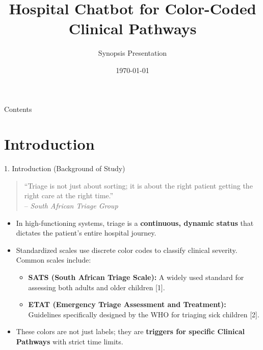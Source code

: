 \documentclass[11pt, aspectratio=169]{beamer}
\title[Hospital Chatbot for Clinical Pathways]{Hospital Chatbot for Color-Coded Clinical Pathways}
\subtitle{}
\author{Synopsis Presentation}
\date{\today}
\begin{document}
	
	\begin{frame}
		\titlepage
	\end{frame}
	
	\begin{frame}{Contents}
		\tableofcontents
	\end{frame}
	
	\section{Introduction}
	\begin{frame}{1. Introduction (Background of Study)}
		\begin{quote}
			``Triage is not just about sorting; it is about the right patient getting the right care at the right time.'' \\
			-- \textit{South African Triage Group}
		\end{quote}
		\vspace{0.3cm}
		\begin{itemize}
			\item In high-functioning systems, triage is a \textbf{continuous, dynamic status} that dictates the patient's entire hospital journey.
			\item Standardized scales use discrete color codes to classify clinical severity. Common scales include:
			\begin{itemize}
				\item \textbf{SATS (South African Triage Scale):} A widely used standard for assessing both adults and older children [1].
				\item \textbf{ETAT (Emergency Triage Assessment and Treatment):} Guidelines specifically designed by the WHO for triaging sick children [2].
			\end{itemize}
			\item These colors are not just labels; they are \textbf{triggers for specific Clinical Pathways} with strict time limits.
		\end{itemize}
	\end{frame}
	
\end{document}
